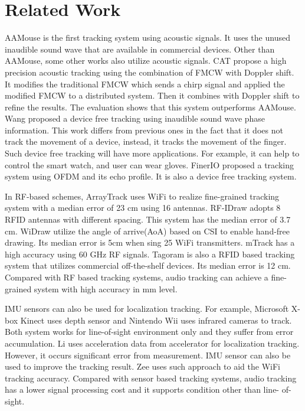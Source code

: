 \documentclass{acm_proc_article-sp}
\begin{document}
\section{Related Work} \label{related_work}
AAMouse is the first tracking system using acoustic signals. It uses
the unused inaudible sound wave that are available in commercial 
devices.
Other
than AAMouse, some other works also utilize acoustic signals. 
CAT \cite{Mao:2016:HAM:2973750.2985617} propose a high precision acoustic tracking using the combination of FMCW with Doppler shift.
It modifies the traditional FMCW which sends a chirp signal and 
applied the modified FMCW to a distributed system. Then it combines 
with Doppler shift to refine the results. The evaluation shows that
this system outperforms AAMouse.
Wang \cite{Wang:2016:DGT:2973750.2973764}
proposed a device free tracking using inaudible sound wave phase 
information. This work differs from previous ones in the fact that it
does not track the movement of a device, instead, it tracks the
movement of the finger. Such device free tracking will have more
applications. For example, it can help to control the smart watch,
and user can wear gloves.
FinerIO 
\cite{Nandakumar:2016:FUA:2858036.2858580} proposed a tracking system
using OFDM and its echo profile. It is also a device free 
tracking system.

In RF-based schemes, ArrayTrack \cite{Xiong:2013:AFI:2482626.2482635}
uses WiFi to realize fine-grained tracking system with a median error of 23 cm using 16 antennas. RF-IDraw 
\cite{Vasisht:2014:RVT:2645884.2645889} 
adopts 8 RFID antennas with different spacing. This system has the
median error of 3.7 cm. WiDraw \cite{Sun:2015:WEH:2789168.2790129}
utilize the angle of arrive(AoA) based on CSI to enable hand-free
drawing. Its median error is 5cm when sing 25 WiFi transmitters.
mTrack \cite{Wei:2015:MHP:2789168.2790113}
has a high accuracy using 60 GHz RF signals.
Tagoram \cite{Yang:2014:TRT:2639108.2639111} 
is also a RFID based tracking system that utilizes
commercial off-the-shelf devices. Its median error is 12 cm.
Compared with RF based tracking systems, audio tracking can achieve
a fine-grained system with high accuracy in mm level.

IMU sensors can also be used for localization tracking. 
For example,
Microsoft X-box Kinect
uses depth sensor and
Nintendo Wii 
uses infrared cameras to track. Both system works for line-of-sight
environment only and they suffer from error accumulation. 
Li \cite{Li:2012:RAI:2370216.2370280}
uses acceleration data from accelerator for localization
tracking. However, it occurs significant error from measurement.
IMU sensor can also be used to improve the tracking result.
Zee \cite{Rai:2012:ZZC:2348543.2348580}
uses such approach to aid the WiFi tracking accuracy. 
Compared
with sensor based tracking systems, audio tracking has a lower 
signal processing cost and it supports condition other than line-
of-sight. 
\end{document}
